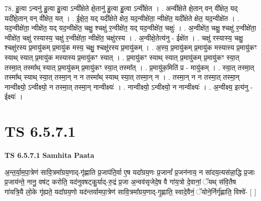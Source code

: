 \documentclass[17pt]{extarticle}
\begin{document}
78. हु॒त्वा ऽन्वनु॑ हु॒त्वा हु॒त्वा ऽन्वी᳚क्षेते क्षे॒तानु॑ हु॒त्वा हु॒त्वा ऽन्वी᳚क्षेत । . अन्वी᳚क्षेते क्षे॒तान् वन् वी᳚क्षेत॒ यद् यदी᳚क्षे॒तान् वन् वी᳚क्षेत॒ यत् । . ई॒क्षे॒त॒ यद् यदी᳚क्षेते क्षेत॒ यद॒न्वीक्षे॑ता॒ न्वीक्षे॑त॒ यदी᳚क्षेते क्षेत॒ यद॒न्वीक्षे॑त । . यद॒न्वीक्षे॑ता॒ न्वीक्षे॑त॒ यद् यद॒न्वीक्षे॑त॒ चक्षु॒ श्चक्षु॑ र॒न्वीक्षे॑त॒ यद् यद॒न्वीक्षे॑त॒ चक्षुः॑ । . अ॒न्वीक्षे॑त॒ चक्षु॒ श्चक्षु॑ र॒न्वीक्षे॑ता॒ न्वीक्षे॑त॒ चक्षु॑ रस्यास्य॒ चक्षु॑ र॒न्वीक्षे॑ता॒ न्वीक्षे॑त॒ चक्षु॑रस्य । . अ॒न्वीक्षे॒तेत्य॑नु - ईक्षे॑त । . चक्षु॑ रस्यास्य॒ चक्षु॒ श्चक्षु॑रस्य प्र॒मायु॑कम् प्र॒मायु॑क मस्य॒ चक्षु॒ श्चक्षु॑रस्य प्र॒मायु॑कम् । . अ॒स्य॒ प्र॒मायु॑कम् प्र॒मायु॑क मस्यास्य प्र॒मायु॑कꣳ स्याथ् स्यात् प्र॒मायु॑क मस्यास्य प्र॒मायु॑कꣳ स्यात् । . प्र॒मायु॑कꣳ स्याथ् स्यात् प्र॒मायु॑कम् प्र॒मायु॑कꣳ स्या॒त् तस्मा॒त् तस्मा᳚थ् स्यात् प्र॒मायु॑कम् प्र॒मायु॑कꣳ स्या॒त् तस्मा᳚त् । . प्र॒मायु॑क॒मिति॑ प्र - मायु॑कम् । . स्या॒त् तस्मा॒त् तस्मा᳚थ् स्याथ् स्या॒त् तस्मा॒न् न न तस्मा᳚थ् स्याथ् स्या॒त् तस्मा॒न् न । . तस्मा॒न् न न तस्मा॒त् तस्मा॒न् नान्वीक्ष्यो॒ ऽन्वीक्ष्यो॒ न तस्मा॒त् तस्मा॒न् नान्वीक्ष्यः॑ । . नान्वीक्ष्यो॒ ऽन्वीक्ष्यो॒ न नान्वीक्ष्यः॑ । . अ॒न्वीक्ष्य॒ इत्य॑नु - ईक्ष्यः॑ । \newline
\pagebreak
{}

\section{ TS 6.5.7.1 }

\textbf{TS 6.5.7.1 } \newline
\textbf{Samhita Paata} \newline

अ॒न्त॒र्या॒म॒पा॒त्रेण॑ सावि॒त्रमा᳚ग्रय॒णाद्-गृ॑ह्णाति प्र॒जाप॑ति॒र्वा ए॒ष यदा᳚ग्रय॒णः प्र॒जानां᳚ प्र॒जन॑नाय॒ न सा॑दय॒त्यस॑न्ना॒द्धि प्र॒जाः प्र॒जाय॑न्ते॒ नानु॒ वष॑ट् करोति॒ यद॑नुवषट्कु॒र्याद्-रु॒द्रं प्र॒जा अ॒न्वव॑सृजेदे॒ष वै गा॑य॒त्रो दे॒वानां॒ ॅयथ् स॑वि॒तैष गा॑यत्रि॒यै लो॒के गृ॑ह्यते॒ यदा᳚ग्रय॒णो यद॑न्तर्यामपा॒त्रेण॑ सावि॒त्रमा᳚ग्रय॒णाद्-गृ॒ह्णाति॒ स्वादे॒वैनं॒ ॅयोने॒र्निर्गृ॑ह्णाति॒ विश्वे॑- [  ] \newline
\end{document}
